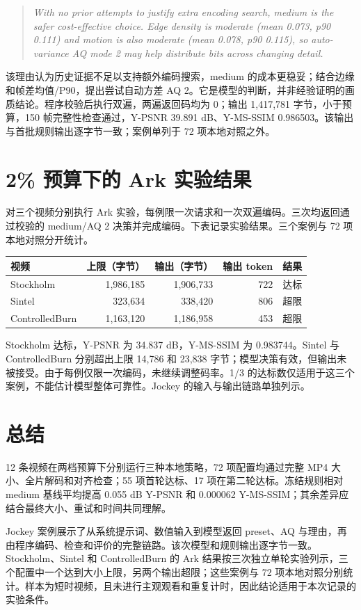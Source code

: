 \documentclass[UTF8,10pt,a4paper]{ctexart}
\begin{document}
\begin{quote}\small\itshape
With no prior attempts to justify extra encoding search, medium is the safer cost-effective choice. Edge density is moderate (mean 0.073, p90 0.111) and motion is also moderate (mean 0.078, p90 0.115), so auto-variance AQ mode 2 may help distribute bits across changing detail.
\end{quote}
该理由认为历史证据不足以支持额外编码搜索，medium 的成本更稳妥；结合边缘和帧差均值/P90，提出尝试自动方差 AQ 2。它是模型的判断，并非经验证明的画质结论。程序校验后执行双遍，两遍返回码均为 0；输出 1,417,781 字节，小于预算，150 帧完整性检查通过，Y-PSNR 39.891 dB、Y-MS-SSIM 0.986503。该输出与首批规则输出逐字节一致；案例单列于 72 项本地对照之外。


\clearpage
\section{2\% 预算下的 Ark 实验结果}
对三个视频分别执行 Ark 实验，每例限一次请求和一次双遍编码。三次均返回通过校验的 medium/AQ 2 决策并完成编码。下表记录实验结果。三个案例与 72 项本地对照分开统计。
\begin{center}\begin{tabular}{lrrrl}\hline
视频 & 上限（字节） & 输出（字节） & 输出 token & 结果 \\\hline
Stockholm & 1,986,185 & 1,906,733 & 722 & 达标 \\
Sintel & 323,634 & 338,420 & 806 & 超限 \\
ControlledBurn & 1,163,120 & 1,186,958 & 453 & 超限 \\\hline
\end{tabular}\end{center}
Stockholm 达标，Y-PSNR 为 34.837 dB，Y-MS-SSIM 为 0.983744。Sintel 与 ControlledBurn 分别超出上限 14,786 和 23,838 字节；模型决策有效，但输出未被接受。由于每例仅限一次编码，未继续调整码率。1/3 的达标数仅适用于这三个案例，不能估计模型整体可靠性。Jockey 的输入与输出链路单独列示。


\section{总结}
12 条视频在两档预算下分别运行三种本地策略，72 项配置均通过完整 MP4 大小、全片解码和对齐检查；55 项首轮达标、17 项在第二轮达标。冻结规则相对 medium 基线平均提高 0.055 dB Y-PSNR 和 0.000062 Y-MS-SSIM；其余差异应结合最终大小、重试和时间共同理解。

Jockey 案例展示了从系统提示词、数值输入到模型返回 preset、AQ 与理由，再由程序编码、检查和评价的完整链路。该次模型和规则输出逐字节一致。Stockholm、Sintel 和 ControlledBurn 的 Ark 结果按三次独立单轮实验列示，三个配置中一个达到大小上限，另两个输出超限；这些案例与 72 项本地对照分别统计。样本为短时视频，且未进行主观观看和重复计时，因此结论适用于本次记录的实验条件。
\end{document}
